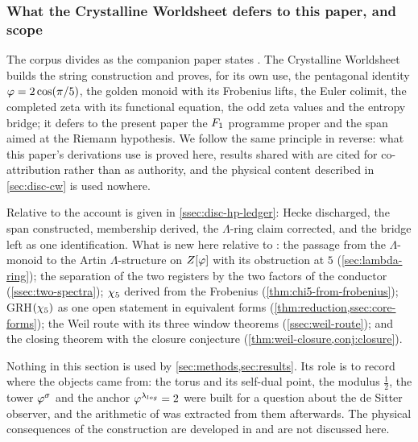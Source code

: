 \subsubsection{What the Crystalline Worldsheet defers to this paper, and scope}\label{sec:companions}

The corpus divides as the companion paper states \cite[\S1.9]{gonzalez26cw}.  The
Crystalline Worldsheet builds the string construction and proves, for its own use,
the pentagonal identity $\varphi=2\cos(\pi/5)$, the golden monoid with its
Frobenius lifts, the Euler colimit, the completed zeta with its functional
equation, the odd zeta values and the entropy bridge; it defers to the present
paper the $F_1$ programme proper and the span aimed at the Riemann hypothesis.
We follow the same principle in reverse: what this paper's derivations use is
proved here, results shared with \cite{gonzalez26cw} are cited for
co-attribution rather than as authority, and the physical content described in
\cref{sec:disc-cw} is used nowhere.

Relative to \cite{gonzalez25hp} the account is given in
\cref{ssec:disc-hp-ledger}: Hecke discharged, the span constructed, membership derived,
the $\Lambda$-ring claim corrected, and the bridge left as one identification.
What is new here relative to \cite{gonzalez26cw}: the passage from the
$\Lambda$-monoid to the Artin $\Lambda$-structure on $Z[\varphi]$ with its obstruction
at $5$ (\cref{sec:lambda-ring}); the separation of the two registers by the two
factors of the conductor (\cref{ssec:two-spectra}); $\chi_5$ derived from the
Frobenius (\cref{thm:chi5-from-frobenius}); GRH$(\chi_5)$ as one open statement in equivalent forms (\cref{thm:reduction,ssec:core-forms}); the Weil route with its three
window theorems (\cref{ssec:weil-route}); and the closing theorem with the closure conjecture
(\cref{thm:weil-closure,conj:closure}).

\label{sec:cw-scope}
Nothing in this section is used by \cref{sec:methods,sec:results}.  Its role is
to record where the objects came from: the torus and its self-dual point, the
modulus $\tfrac12$, the tower $\varphi^{\sigma}$ and the anchor
$\varphi^{\lambda_{log}}=2$ were built for a question about the de Sitter observer, and
the arithmetic of  was extracted from them afterwards.  The physical
consequences of the construction are developed in \cite{gonzalez26cw} and are not
discussed here.


